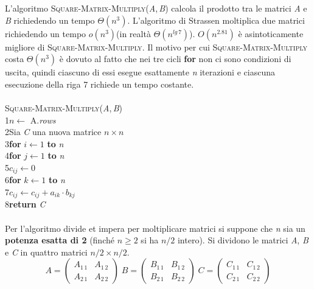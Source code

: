 \documentclass[10pt, a4paper]{report}
\newcommand\firsttab[1][0.5cm]{\hspace*{#1}}
\newcommand\secondtab[1][1cm]{\hspace*{#1}}
\newcommand\thirdtab[1][1.5cm]{\hspace*{#1}}
\begin{document}
L'algoritmo \textsc{Square-Matrix-Multiply(\textit{A},\,\textit{B})} calcola il prodotto tra le matrici \textit{A} e \textit{B} richiedendo un tempo $\Theta(n^3)$. L'algoritmo di Strassen moltiplica due matrici richiedendo un tempo $o(n^3)$(in realtà $\Theta(n^{lg\,7})$). $O(n^{2.81})$ è asintoticamente migliore di \textsc{Square-Matrix-Multiply}. Il motivo per cui \textsc{Square-Matrix-Multiply} costa $\Theta(n^3)$ è dovuto al fatto che nei tre cicli \textbf{for} non ci sono condizioni di uscita, quindi ciascuno di essi esegue esattamente \textit{n} iterazioni e ciascuna esecuzione della riga 7 richiede un tempo costante.\\\\
\textsc{Square-Matrix-Multiply(\textit{A},\,\textit{B})}\\
1\firsttab $n \leftarrow$ A.\textit{rows}\\
2\firsttab Sia \textit{C} una nuova matrice $n \times n$\\
3\firsttab\textbf{for} $i \leftarrow 1$ \textbf{to} \textit{n}\\
4\secondtab\textbf{for} $j \leftarrow 1$ \textbf{to} \textit{n}\\
5\thirdtab$c_{ij} \leftarrow 0$\\
6\thirdtab\textbf{for} $k \leftarrow 1$ \textbf{to} \textit{n}\\
7\firsttab\thirdtab$c_{ij} \leftarrow c_{ij} + a_{ik} \cdot b_{kj}$\\
8\firsttab\textbf{return} \textit{C}\\\\
Per l'algoritmo divide et impera per moltiplicare matrici si suppone che \textit{n} sia un \textbf{potenza esatta di 2} (finché $n \geq 2$ si ha $n/2$ intero). Si dividono le matrici \textit{A}, \textit{B} e \textit{C} in quattro matrici $n/2 \times n/2$.
\begin{displaymath}
A =\left(\begin{array}{cc}
A_{1\,1} &A_{1\,2}\\
A_{2\,1} &A_{2\,2}
\end{array}\right)
\;B = \left(\begin{array}{cc}
B_{1\,1} &B_{1\,2}\\
B_{2\,1} &B_{2\,2}
\end{array}\right)
\;C = \left(\begin{array}{cc}
C_{1\,1} &C_{1\,2}\\
C_{2\,1} &C_{2\,2}
\end{array}\right)
\end{displaymath}
\end{document}
